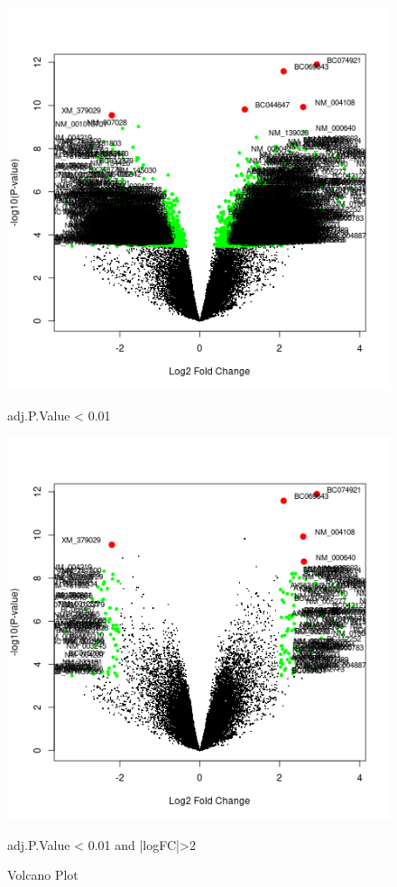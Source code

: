 \documentclass[12pt, ]{article}
\begin{document}
\begin{figure}[!htbp]

\begin{minipage}{.48\textwidth}
\includegraphics[width=\textwidth]{VolcanoPlotadj.png}
\scriptsize\centerline{adj.P.Value < 0.01}
\end{minipage}\hfill
\begin{minipage}{.48\textwidth}
\includegraphics[width=\textwidth]{VolcanoPlotadjlogFC.png}
\scriptsize\centerline{adj.P.Value < 0.01 and |logFC|>2}
\end{minipage}
\caption{Volcano Plot}
\end{figure}
\end{document}
